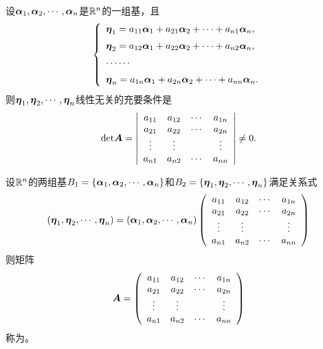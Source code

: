 \begin{frame}\ft{\secname}


\begin{dingli}
  设$\boldsymbol{\alpha}_1,\boldsymbol{\alpha}_2,\cdots,\boldsymbol{\alpha}_n$是$\mathbb R^n$的一组基，且
  $$
  \left\{
    \begin{array}{l}
      \boldsymbol{\eta}_1=a_{11}\boldsymbol{\alpha}_1+a_{21}\boldsymbol{\alpha}_2+\cdots+a_{n1}\boldsymbol{\alpha}_n,\\[0.2cm]
      \boldsymbol{\eta}_2=a_{12}\boldsymbol{\alpha}_1+a_{22}\boldsymbol{\alpha}_2+\cdots+a_{n2}\boldsymbol{\alpha}_n,\\[0.2cm]
      \cdots\cdots\\[0.2cm]
      \boldsymbol{\eta}_n=a_{1n}\boldsymbol{\alpha}_1+a_{2n}\boldsymbol{\alpha}_2+\cdots+a_{nn}\boldsymbol{\alpha}_n.
    \end{array}
  \right.
  $$
  则$\boldsymbol{\eta}_1,\boldsymbol{\eta}_2,\cdots,\boldsymbol{\eta}_n$线性无关的充要条件是
  $$
  \mathrm{det}\boldsymbol{A}=\left|
    \begin{array}{cccc}
      a_{11}&a_{12}&\cdots&a_{1n}\\
      a_{21}&a_{22}&\cdots&a_{2n}\\
      \vdots&\vdots&&\vdots\\
      a_{n1}&a_{n2}&\cdots&a_{nn}
    \end{array}
  \right|\ne 0.
  $$
\end{dingli}
\end{frame}

\begin{frame}\ft{\secname}
  \begin{dingyi}
    设$\mathbb R^n$的两组基$B_1=\{\boldsymbol{\alpha}_1,\boldsymbol{\alpha}_2,\cdots,\boldsymbol{\alpha}_n\}$和$B_2=\{\boldsymbol{\eta}_1,\boldsymbol{\eta}_2,\cdots,\boldsymbol{\eta}_n\}$满足关系式
    $$
    (\boldsymbol{\eta}_1,\boldsymbol{\eta}_2,\cdots,\boldsymbol{\eta}_n)=(\boldsymbol{\alpha}_1,\boldsymbol{\alpha}_2,\cdots,\boldsymbol{\alpha}_n)\left(
      \begin{array}{cccc}
        a_{11}&a_{12}&\cdots&a_{1n}\\
        a_{21}&a_{22}&\cdots&a_{2n}\\
        \vdots&\vdots&&\vdots\\
        a_{n1}&a_{n2}&\cdots&a_{nn}
      \end{array}
    \right)
    $$
    则矩阵
    $$
    \boldsymbol{A}=\left(
      \begin{array}{cccc}
        a_{11}&a_{12}&\cdots&a_{1n}\\
        a_{21}&a_{22}&\cdots&a_{2n}\\
        \vdots&\vdots&&\vdots\\
        a_{n1}&a_{n2}&\cdots&a_{nn}
      \end{array}
    \right)
    $$
    称为。
  \end{dingyi}
\end{frame}

